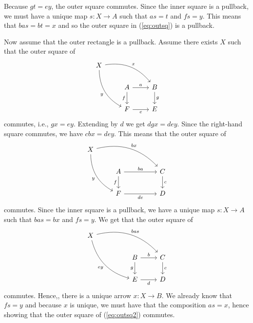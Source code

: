 \documentclass[11pt,a4paper]{article}
\begin{document}
\begin{solution}
\begin{equation*}
    \end{equation*}
    Because $gt=ey$, the outer square commutes. Since the inner square is a pullback, we must have a unique map $s:X\to A$ such that $as=t$ and $fs=y$. This means that $bas=bt=x$ and so the outer square in (\ref{eq:outsq}) is a pullback.\par
    Now assume that the outer rectangle is a pullback. Assume there exists $X$ such that the outer square of
    \begin{equation}\label{eq:outsq2}
    \begin{tikzcd}
        X \arrow[drr, bend left, "x"] \arrow[ddr, bend right, "y"'] \\
        & A \arrow[r, "a"] \arrow[d, "f"'] & B \arrow[d, "g"] \\
        & F \arrow[r, "e"'] & E
    \end{tikzcd}
    \end{equation}
    commutes, i.e., $gx=ey$. Extending by $d$ we get $dgx=dey$. Since the right-hand square commutes, we have $cbx=dey$. This means that the outer square of
    \begin{equation*}
    \begin{tikzcd}
        X \arrow[drrr, bend left, "bx"] \arrow[ddr, bend right, "y"'] \\
        & A \arrow[rr, "ba"] \arrow[d, "f"'] && C \arrow[d, "c"] \\
        & F \arrow[rr, "de"'] && D
    \end{tikzcd}
    \end{equation*}
    commutes. Since the inner square is a pullback, we have a unique map $s:X\to A$ such that $bas=bx$ and $fs=y$. We get that the outer square of
    \begin{equation*}
    \begin{tikzcd}
        X \arrow[drrr, bend left, "bas"] \arrow[ddrr, bend right, "ey"'] \\
        && B \arrow[r, "b"] \arrow[d, "g"'] & C \arrow[d, "c"] \\
        && E \arrow[r, "d"'] & D
    \end{tikzcd}
    \end{equation*}
    commutes. Hence,, there is a unique arrow $x:X\to B$. We already know that $fs=y$ and because $x$ is unique, we must have that the composition $as=x$, hence showing that the outer square of (\ref{eq:outsq2}) commutes.
\end{solution}
\end{document}
